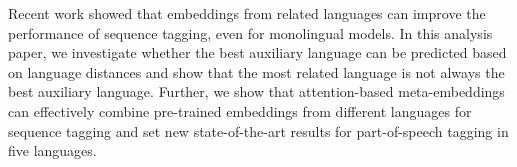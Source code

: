 Recent work showed that embeddings from related languages can improve the performance of sequence tagging, even for monolingual models. In this analysis paper, we investigate whether the best auxiliary language can be predicted based on language distances and show that the most related language is not always the best auxiliary language. Further, we show that attention-based meta-embeddings can effectively combine pre-trained embeddings from different languages for sequence tagging and set new state-of-the-art results for part-of-speech tagging in five languages.
